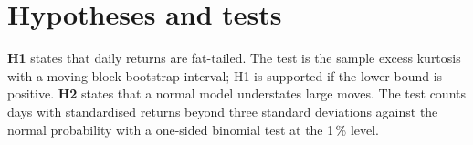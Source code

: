 \section{Hypotheses and tests}\label{sec:hypotheses}

\textbf{H1} states that daily returns are fat-tailed. The test is the sample excess
kurtosis with a moving-block bootstrap interval; H1 is supported if the lower bound is
positive. \textbf{H2} states that a normal model understates large moves. The test counts
days with standardised returns beyond three standard deviations against the normal
probability with a one-sided binomial test at the 1\,\% level.

